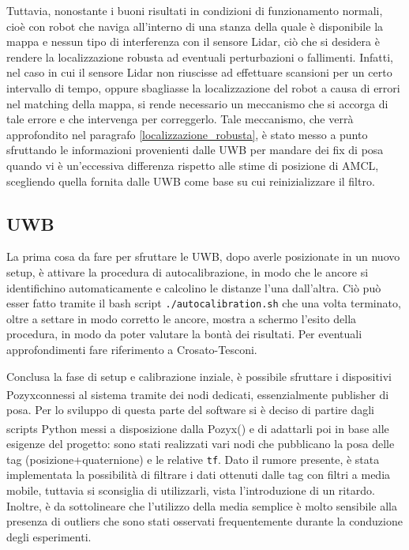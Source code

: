 \bigskip

Tuttavia, nonostante i buoni risultati in condizioni di funzionamento normali, cioè con robot che naviga all’interno di una stanza della quale è disponibile la mappa e nessun tipo di interferenza con il sensore Lidar, ciò che si desidera è rendere la localizzazione robusta ad eventuali perturbazioni o fallimenti.
Infatti, nel caso in cui il sensore Lidar non riuscisse ad effettuare scansioni per un certo intervallo di tempo, oppure sbagliasse la localizzazione del robot a causa di errori nel matching della mappa, si rende necessario un meccanismo che si accorga di tale errore e che intervenga per correggerlo.
Tale meccanismo, che verrà approfondito nel paragrafo \ref{localizzazione_robusta}, è stato messo a punto sfruttando le informazioni provenienti dalle UWB per mandare dei fix di posa quando vi è un'eccessiva differenza rispetto alle stime di posizione di AMCL, scegliendo quella fornita dalle UWB come base su cui reinizializzare il filtro.

\subsection{UWB}
\label{uwb}

La prima cosa da fare per sfruttare le UWB, dopo averle posizionate in un nuovo setup, è attivare la procedura di autocalibrazione, in modo che le ancore si identifichino automaticamente e calcolino le distanze l’una dall’altra. 
Ciò può esser fatto tramite il bash script \verb!./autocalibration.sh! che una volta terminato, oltre a settare in modo corretto le ancore, mostra a schermo l'esito della procedura, in modo da poter valutare la bontà dei risultati. Per eventuali approfondimenti fare riferimento a Crosato-Tesconi\cite{REPORT:1}.

\bigskip

Conclusa la fase di setup e calibrazione inziale, è possibile sfruttare i dispositivi Pozyx\textsuperscript\textregistered\hspace{1mm}connessi al sistema tramite dei nodi dedicati, essenzialmente publisher di posa. Per lo sviluppo di questa parte del software si è deciso di partire dagli scripts Python messi a disposizione dalla Pozyx\textsuperscript\textregistered\hspace{1mm}(\cite{WEBSITE:1}) e di adattarli poi in base alle esigenze del progetto: sono stati realizzati vari nodi che pubblicano la posa delle tag (posizione+quaternione) e le relative \verb!tf!. Dato il rumore presente, è stata implementata la possibilità di filtrare i dati ottenuti dalle tag con filtri a media mobile, tuttavia si sconsiglia di utilizzarli, vista l’introduzione di un ritardo. Inoltre, è da sottolineare che l'utilizzo della media semplice è molto sensibile alla presenza di outliers che sono stati osservati frequentemente durante la conduzione degli esperimenti.

